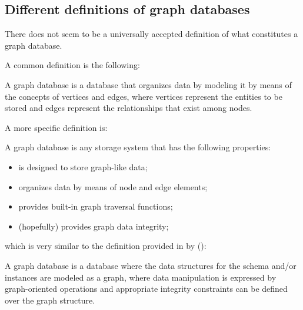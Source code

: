 \subsection{Different definitions of graph databases} \label{subsection:LiteratureReview/ReviewofGraphDatabaseSystems/Differentdefinitionsofgraphdatabases}
There does not seem to be a universally accepted definition of what constitutes a graph database.

A common definition is the following:
\begin{definition}\label{definition:ofgraphdatabasescommon}
	A graph database is a database that organizes data by modeling it by means of the concepts of vertices and edges, where vertices represent the entities to be stored and edges represent the relationships that exist among nodes.
\end{definition}

A more specific definition is:

\begin{definition}\label{definition:ofgraphdatabasesspecific}
	A graph database is any storage system that has the following properties:
	 \begin{itemize}[noitemsep]
		\item is designed to store graph-like data;
		\item organizes data by means of node and edge elements;
		\item provides built-in graph traversal functions;
		\item (hopefully) provides graph data integrity;
	\end{itemize}
\end{definition}

which is very similar to the definition provided in  by \citeauthor{AnglesGutierrez2018} (\citeyear{AnglesGutierrez2018}):

\begin{definition}\label{definition:ofgraphdatabasesbyAnglesandGutierrez}
	A graph database is a database where the data structures for the schema and/or instances are modeled as a graph, where \gls{data manipulation} is expressed by graph-oriented operations and appropriate integrity constraints can be defined over the graph structure.
\end{definition}


